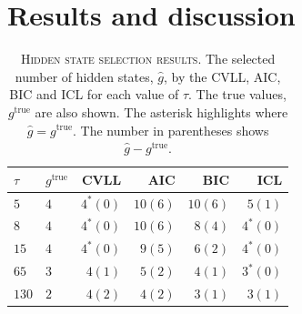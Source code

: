 \section{Results and discussion}\label{sec:hmm_results}
\begin{table}
    \centering
    \begin{tabular}{llrrrr}
    \toprule
    $\tau$ & $g^{\mathrm{true}}$ & CVLL & AIC & BIC & ICL  \\
    \midrule
     $5$  & $4$ & $4^{*} (0)$  & $10 (6)$ & $10 (6)$ & $5 (1)$ \\
     $8$  & $4$ & $4^{*} (0)$ & $10 (6)$ & $8 (4)$  & $4^{*} (0)$  \\
     $15$ & $4$ & $4^{*} (0)$  & $9 (5)$ & $6 (2)$  & $4^{*} (0)$  \\
     $65 $& $3$ & $4 (1)$  & $5 (2)$  & $4 (1)$  & $3^{*} (0)$  \\
     $130$& $2$ & $4 (2)$  & $4 (2)$  & $3 (1)$  & $3 (1)$  \\
     \bottomrule
    \end{tabular}
    \caption[Hidden state selection results]{\textsc{Hidden state selection results}. The selected number of hidden states, $\hat{g}$, by the CVLL, AIC, BIC and ICL for each value of $\tau$. The true values, $g^{\mathrm{true}}$ are also shown. The asterisk highlights where $\hat{g}=g^{\mathrm{true}}$. The number in parentheses shows $\hat{g}-g^{\mathrm{true}}$. }
    \label{tab:prinz_criteria_results}
\end{table}

